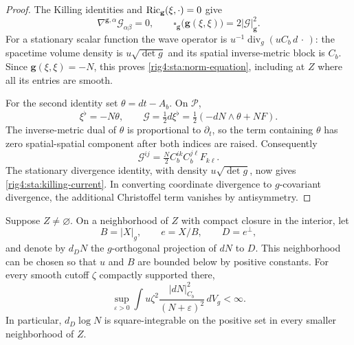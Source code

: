\begin{proof}
The Killing identities and $\operatorname{Ric}_{\mathbf g}(\xi,\cdot)=0$ give
\[
 \nabla^{\mathbf g,\alpha}\mathcal G_{\alpha\beta}=0,
 \qquad
 \square_{\mathbf g}\bigl(\mathbf g(\xi,\xi)\bigr)
       =2|\mathcal G|_{\mathbf g}^2.
\]
For a stationary scalar function the wave operator is
$u^{-1}\operatorname{div}_g(uC_b\,d\,\cdot\,)$: the spacetime volume
density is $u\sqrt{\det g}$ and its spatial inverse-metric block is
$C_b$. Since $\mathbf g(\xi,\xi)=-N$, this proves
\eqref{rig4:sta:norm-equation}, including at $Z$ where all its entries are
smooth.

For the second identity set $\theta=dt-A_b$. On $\mathcal P$,
\[
 \xi^\flat=-N\theta,
 \qquad
 \mathcal G=\tfrac12d\xi^\flat
            =\tfrac12(-dN\wedge\theta+NF).
\]
The inverse-metric dual of $\theta$ is proportional to $\partial_t$,
so the term containing $\theta$ has zero spatial-spatial component after
both indices are raised. Consequently
\[
 \mathcal G^{ij}=\tfrac N2 C_b^{ik}C_b^{j\ell}F_{k\ell}.
\]
The stationary divergence identity, with density $u\sqrt{\det g}$,
now gives \eqref{rig4:sta:killing-current}. In converting coordinate
divergence to $g$-covariant divergence, the additional Christoffel term
vanishes by antisymmetry.
\end{proof}

\begin{lemma}\label{rig4:sta:log-estimate}
Suppose $Z\ne\varnothing$. On a neighborhood of $Z$ with compact closure
in the interior, let
\[
 B=|X|_g,\qquad e=X/B,\qquad D=e^\perp,
\]
and denote by $d_DN$ the $g$-orthogonal projection of $dN$ to $D$.
This neighborhood can be chosen so that $u$ and $B$ are bounded below
by positive constants. For every smooth cutoff $\zeta$ compactly
supported there,
\begin{equation}\label{rig4:sta:null-log-energy}
 \sup_{\varepsilon>0}
 \int u\zeta^2\frac{|dN|_{C_b}^2}{(N+\varepsilon)^2}\,dV_g
 <\infty.
\end{equation}
In particular, $d_D\log N$ is square-integrable on the positive set
in every smaller neighborhood of $Z$.
\end{lemma}

